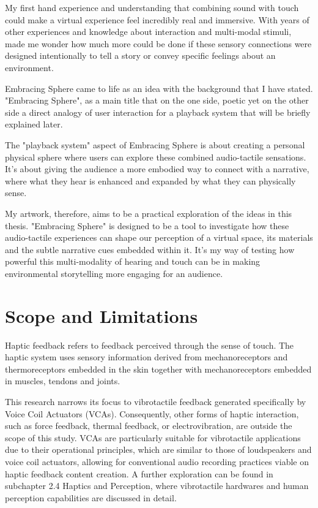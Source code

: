     My first hand experience and understanding that combining sound with touch could make a virtual experience feel incredibly real and immersive. With years of other experiences and knowledge about interaction and multi-modal stimuli, made me wonder how much more could be done if these sensory connections were designed intentionally to tell a story or convey specific feelings about an environment.\par

    Embracing Sphere came to life as an idea with the background that I have stated. "Embracing Sphere", as a main title that on the one side, poetic yet on the other side a direct analogy of user interaction for a playback system that will be briefly explained later.\par
    
    The "playback system" aspect of Embracing Sphere is about creating a personal physical sphere where users can explore these combined audio-tactile sensations. It's about giving the audience a more embodied way to connect with a narrative, where what they hear is enhanced and expanded by what they can physically sense.\par
    
    My artwork, therefore, aims to be a practical exploration of the ideas in this thesis. "Embracing Sphere" is designed to be a tool to investigate how these audio-tactile experiences can shape our perception of a virtual space, its materials and the subtle narrative cues embedded within it. It’s my way of testing how powerful this multi-modality of hearing and touch can be in making environmental storytelling more engaging for an audience.\par

    \section{Scope and Limitations}
    Haptic feedback refers to feedback perceived through the sense of touch. The haptic system uses sensory information derived from mechanoreceptors and thermoreceptors embedded in the skin together with mechanoreceptors embedded in muscles, tendons and joints\cite{Haptic_Perception-A_Tutorial}.\par 

    This research narrows its focus to vibrotactile feedback generated specifically by Voice Coil Actuators (VCAs). Consequently, other forms of haptic interaction, such as force feedback, thermal feedback, or electrovibration, are outside the scope of this study. VCAs are particularly suitable for vibrotactile applications due to their operational principles, which are similar to those of loudspeakers and voice coil actuators\cite{Audio-Tactile_Rendering}, allowing for conventional audio recording practices viable on haptic feedback content creation. A further exploration can be found in subchapter 2.4 Haptics and Perception, where vibrotactile hardwares and human perception capabilities are discussed in detail.\par 

